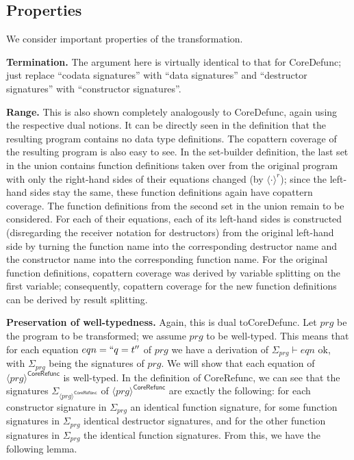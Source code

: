 \subsection{Properties}

We consider important properties of the transformation.

\textbf{Termination.} The argument here is virtually identical to that for \textsf{CoreDefunc}; just replace ``codata signatures'' with ``data signatures'' and ``destructor signatures'' with ``constructor signatures''.

\textbf{Range.} This is also shown completely analogously to \textsf{CoreDefunc}, again using the respective dual notions. It can be directly seen in the definition that the resulting program contains no data type definitions. The copattern coverage of the resulting program is also easy to see. In the set-builder definition, the last set in the union contains function definitions taken over from the original program with only the right-hand sides of their equations changed (by $\langle \cdot \rangle^r$); since the left-hand sides stay the same, these function definitions again have copattern coverage. The function definitions from the second set in the union remain to be considered. For each of their equations, each of its left-hand sides is constructed (disregarding the receiver notation for destructors) from the original left-hand side by turning the function name into the corresponding destructor name and the constructor name into the corresponding function name. For the original function definitions, copattern coverage was derived by variable splitting on the first variable; consequently, copattern coverage for the new function definitions can be derived by result splitting.

\textbf{Preservation of well-typedness.} Again, this is dual to\textsf{CoreDefunc}. Let $prg$ be the program to be transformed; we assume $prg$ to be well-typed. This means that for each equation $eqn = `` q = t ''$ of $prg$ we have a derivation of $\Sigma_{prg} \vdash eqn \textrm{ ok}$, with $\Sigma_{prg}$ being the signatures of $prg$. We will show that each equation of $\langle prg \rangle^{\textsf{CoreRefunc}}$ is well-typed. In the definition of \textsf{CoreRefunc}, we can see that the signatures $\Sigma_{\langle prg \rangle^{\textsf{CoreRefunc}}}$ of $\langle prg \rangle^{\textsf{CoreRefunc}}$ are exactly the following: for each constructor signature in $\Sigma_{prg}$ an identical function signature, for some function signatures in $\Sigma_{prg}$ identical destructor signatures, and for the other function signatures in $\Sigma_{prg}$ the identical function signatures. From this, we have the following lemma.

